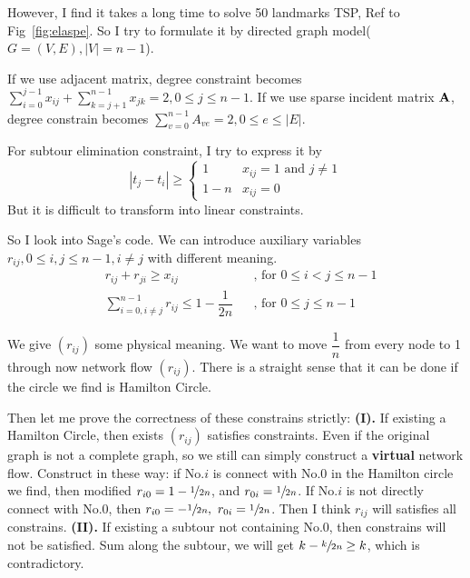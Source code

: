 \documentclass{mcmthesis}
\begin{document}
However, I find it takes a long time to solve 50 landmarks TSP, Ref to Fig~\vref{fig:elaspe}.  So I try to formulate it by directed graph model($G=(V,E),|V|=n-1$). 

If we use adjacent matrix, degree constraint becomes $\sum_{i=0}^{j-1}x_{ij}+\sum_{k=j+1}^{n-1}x_{jk}=2,0 \le j \le n-1$. If we use sparse incident matrix $\mathbf{A}$, degree constrain becomes $\sum_{v=0}^{n-1}A_{ve}=2, 0 \le e \le |E| $. 

For subtour elimination constraint, I try to express it by $$	|t_j-t_i| \ge \begin{cases}
 1 & {x_{ij}=1 \text{ and  } j \ne 1 }\\
   1-n & {x_{ij}=0}
\end{cases}$$ But it is difficult to transform into linear constraints. 

So I look into Sage's code\cite{bib:github/sage/tsp}. We can introduce auxiliary variables $r_{ij},0\le i,j\le n-1,i\ne j$ with different meaning.  
\begin{align}
	 & r_{ij}+r_{ji} \ge x_{ij}                          &  & \text{, for }  0\le i<j\le n-1 \\
	 & \sum_{i=0,i\ne j}^{n-1} r_{ij}\le 1-\dfrac{1}{2n} &   & \text{, for } 0 \le j \le n-1
\end{align}

We give  $(r_{ij})$ some physical meaning. We want to move $\dfrac{1}{n}$ from every node to 1 through now network flow $(r_{ij})$. There is a straight  sense that it can be done if the circle we find is Hamilton Circle. 

Then let me prove the correctness of these constrains strictly:   \quad
\textbf{(I).} If existing a Hamilton Circle, then exists $(r_{ij})$ satisfies constraints. Even if the original graph is not a complete graph, so we still can simply construct a \textbf{virtual} network flow. Construct in these way: if No.$i$ is connect with No.0 in the Hamilton circle we find, then modified $r_{i0}=1-\nicefrac{1}{2n}$, and $r_{0i}=\sfrac{1}{2n}$. If No.$i$ is not directly connect with No.0, then  $r_{i0}= -\sfrac{1}{2n},\  r_{0i}=\sfrac{1}{2n}$. Then I think $r_{ij}$ will satisfies all constrains.
 \quad \textbf{(II).} If existing  a subtour not containing No.0, then  constrains will not be satisfied. Sum along the subtour, we will get $k-\sfrac{k}{2n} \ge k$, which is contradictory.
\end{document}

